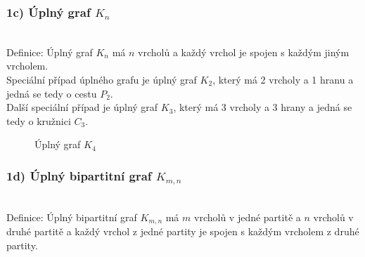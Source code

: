 \documentclass[10pt, a4paper]{ReportSheet}
\begin{document}
    \subsubsection{1c) Úplný graf $K_n$}\\
    Definice: Úplný graf $K_n$ má $n$ vrcholů a každý vrchol je spojen s každým jiným vrcholem.\\
    Speciální případ úplného grafu je úplný graf $K_2$, který má 2 vrcholy a 1 hranu a jedná se tedy o cestu $P_2$.\\
    Další speciální případ je úplný graf $K_3$, který má 3 vrcholy a 3 hrany a jedná se tedy o kružnici $C_3$.
    \begin{figure}[H]
        \centering
        \caption{Úplný graf $K_4$}
        \label{fig:ukol-2-1c-uplny-graf}
    \end{figure}


    \subsubsection{1d) Úplný bipartitní graf $K_{m,n}$}\\
    Definice: Úplný bipartitní graf $K_{m,n}$ má $m$ vrcholů v jedné partitě a $n$ vrcholů v druhé partitě a každý vrchol z jedné partity je spojen s každým vrcholem z druhé partity.
\end{document}

